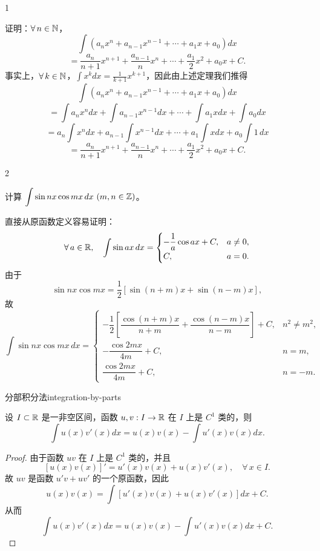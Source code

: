 \begin{sourceexample}{1}

	证明：\(\forall\,n\in\mathbb{N}\)，
	\[
	\int(a_nx^n+a_{n-1}x^{n-1}+\cdots+a_1x+a_0)dx
	\]
	\[
	=\frac{a_n}{n+1}x^{n+1}+\frac{a_{n-1}}nx^n+\cdots+\frac{a_1}2x^2+a_0x+C.
	\]
	事实上，\(\forall\,k\in\mathbb{N}\)，\(\displaystyle\int x^kdx=\frac1{k+1}x^{k+1}\)，因此由上述定理我们推得
	\[
	\int(a_nx^n+a_{n-1}x^{n-1}+\cdots+a_1x+a_0)dx
	\]
	\[
	=\int a_nx^ndx+\int a_{n-1}x^{n-1}dx+\cdots+\int a_1xdx+\int a_0dx
	\]
	\[
	=a_n\int x^ndx+a_{n-1}\int x^{n-1}dx+\cdots+a_1\int xdx+a_0\int 1\,dx
	\]
	\[
	=\frac{a_n}{n+1}x^{n+1}+\frac{a_{n-1}}nx^n+\cdots+\frac{a_1}2x^2+a_0x+C.
	\]

\end{sourceexample}

\begin{sourceexample}{2}

	计算 \(\displaystyle\int\sin nx\cos mx\,dx\ (m,n\in\Z)\)。

	直接从原函数定义容易证明：
	\[
	\forall\,a\in\mathbb{R},\quad\int\sin ax\,dx=\begin{cases} -\dfrac1a\cos ax+C, & a\neq0, \\ C, & a=0. \end{cases}
	\]
	由于
	\[
	\sin nx\cos mx=\frac12\left[\sin(n+m)x+\sin(n-m)x\right],
	\]
	故
	\[
	\int\sin nx\cos mx\,dx=\begin{cases} -\dfrac12\left[\dfrac{\cos(n+m)x}{n+m}+\dfrac{\cos(n-m)x}{n-m}\right]+C, & n^2\neq m^2, \\[6pt] -\dfrac{\cos2mx}{4m}+C, & n=m, \\[6pt] \dfrac{\cos2mx}{4m}+C, & n=-m. \end{cases}
	\]

\end{sourceexample}

\begin{mythm}{分部积分法}{integration-by-parts}

	设 \(I\subset\mathbb{R}\) 是一非空区间，函数 \(u,v:I\to\mathbb{R}\) 在 \(I\) 上是 \(C^1\) 类的，则
	\[
	\int u(x)v'(x)dx=u(x)v(x)-\int u'(x)v(x)dx.
	\]

\end{mythm}

\begin{proof}

	由于函数 \(uv\) 在 \(I\) 上是 \(C^1\) 类的，并且
	\[
	[u(x)v(x)]'=u'(x)v(x)+u(x)v'(x),\quad\forall\,x\in I.
	\]
	故 \(uv\) 是函数 \(u'v+uv'\) 的一个原函数，因此
	\[
	u(x)v(x)=\int[u'(x)v(x)+u(x)v'(x)]dx+C.
	\]
	从而
	\[
	\int u(x)v'(x)dx=u(x)v(x)-\int u'(x)v(x)dx+C.
	\]

\end{proof}

